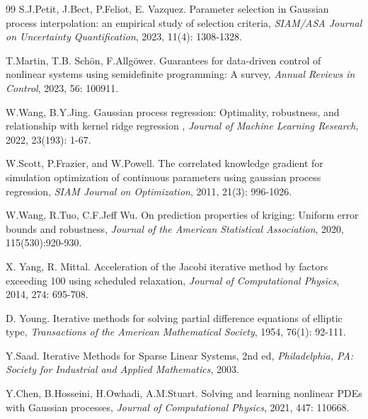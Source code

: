 \documentclass[preprint,review,sort&compress,3p]{elsarticle}
\begin{document}
\begin{thebibliography}{99}
S.J.Petit, J.Bect, P.Feliot, E. Vazquez. 
Parameter selection in Gaussian process interpolation: an empirical study of selection criteria,
{\it SIAM/ASA Journal on Uncertainty Quantification}, 
2023, 11(4): 1308-1328.

T.Martin, T.B. Sch\"{o}n, F.Allg\"{o}wer.
Guarantees for data-driven control of nonlinear systems using semidefinite programming: A survey,
{\it Annual Reviews in Control},
2023, 56: 100911.

W.Wang, B.Y.Jing. 
Gaussian process regression: Optimality, robustness, and relationship with kernel ridge regression{ ,}
{\it Journal of Machine Learning Research}, 
2022, 23(193): 1-67.

W.Scott, P.Frazier, and W.Powell.
The correlated knowledge gradient for simulation optimization of continuous parameters using gaussian process regression,
{\it SIAM Journal on Optimization},
2011, 21(3): 996-1026.

W.Wang, R.Tuo, C.F.Jeff Wu.
On prediction properties of kriging: Uniform error bounds and robustness,
{\it Journal of the American Statistical Association}, 
2020, 115(530):920-930.

{ 
X. Yang, R. Mittal. 
Acceleration of the Jacobi iterative method by factors exceeding 100 using scheduled relaxation,
{\it Journal of Computational Physics}, 
2014, 274: 695-708.
}

D. Young. 
Iterative methods for solving partial difference equations of elliptic type,
{\it Transactions of the American Mathematical Society}, 
1954, 76(1): 92-111.

{ Y.Saad. 
Iterative Methods for Sparse Linear Systems, 2nd ed,
{\it Philadelphia, PA: Society for Industrial and Applied Mathematics}, 
2003.}

Y.Chen, B.Hosseini, H.Owhadi, A.M.Stuart.
Solving and learning nonlinear PDEs with Gaussian processes,
{\it Journal of Computational Physics}, 
2021, 447: 110668.









\end{thebibliography}


\end{document}
